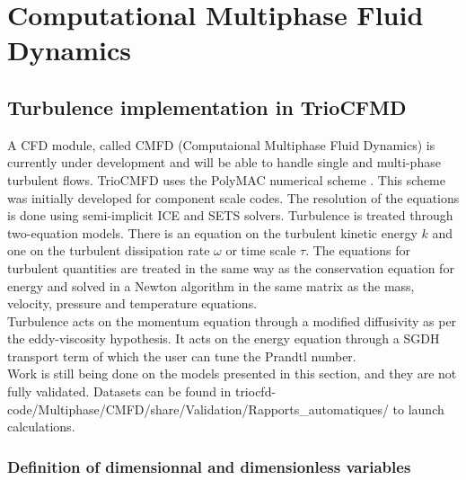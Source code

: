 \chapter{\label{sec:CMFD}Computational Multiphase Fluid Dynamics}
\section{Turbulence implementation in TrioCFMD}
A CFD module, called CMFD (Computaional Multiphase Fluid Dynamics) is currently under development and will be able to handle single and multi-phase turbulent flows. TrioCMFD uses the PolyMAC numerical scheme \cite{Gerschenfeld_PolyMAC2018, Gerschenfeld_PolyMAC2022}. This scheme was initially developed for component scale codes. The resolution of the equations is done using semi-implicit ICE and SETS solvers. Turbulence is treated through two-equation models. There is an equation on the turbulent kinetic energy $k$ and one on the turbulent dissipation rate $\omega$ or time scale $\tau$. The equations for turbulent quantities are treated in the same way as the conservation equation for energy and solved in a Newton algorithm in the same matrix as the mass, velocity, pressure and temperature equations. \\

Turbulence acts on the momentum equation through a modified diffusivity as per the eddy-viscosity hypothesis. It acts on the energy equation through a SGDH transport term of which the user can tune the Prandtl number. \\

Work is still being done on the models presented in this section, and they are not fully validated. Datasets can be found in triocfd-code/Multiphase/CMFD/share/Validation/Rapports\_automatiques/ to launch calculations.
\newpage

\subsection{Definition of dimensionnal and dimensionless variables}

